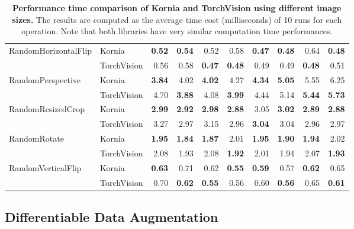 \begin{table}[!ht]
{\begin{tabular}{llrrrrrrrr}
\midrule
RandomHorizontalFlip & Kornia &   \bfseries0.52 &   \bfseries0.54 &   0.52 &   0.58 &   \bfseries0.47 &   \bfseries0.48 &   0.64 &   \bfseries0.48 \\
                   & TorchVision &   0.56 &   0.58 &   \bfseries0.47 &   \bfseries0.48 &   0.49 &   0.49 &   \bfseries0.48 &   0.51 \\
\midrule
RandomPerspective & Kornia &   \bfseries3.84 &   4.02 &   \bfseries4.02 &   4.27 &   \bfseries4.34 &   \bfseries5.05 &   5.55 &   6.25 \\
                   & TorchVision &   4.70 &   \bfseries3.88 &   4.08 &   \bfseries3.99 &   4.44 &   5.14 &   \bfseries5.44 &   \bfseries5.73 \\
\midrule
RandomResizedCrop & Kornia &   \bfseries2.99 &   \bfseries2.92 &   \bfseries2.98 &   \bfseries2.88 &   3.05 &   \bfseries3.02 &   \bfseries2.89 &   \bfseries2.88 \\
                   & TorchVision &   3.27 &   2.97 &   3.15 &   2.96 &   \bfseries3.04 &   3.04 &   2.96 &   2.97 \\
\midrule
RandomRotate & Kornia &   \bfseries1.95 &   \bfseries1.84 &   \bfseries1.87 &   2.01 &   \bfseries1.95 &   \bfseries1.90 &   \bfseries1.94 &   2.02 \\
                   & TorchVision &   2.08 &   1.93 &   2.08 &   \bfseries1.92 &   2.01 &   1.94 &   2.07 &   \bfseries1.93 \\
\midrule
RandomVerticalFlip & Kornia &   \bfseries0.63 &   0.71 &   0.62 &  \bfseries 0.55 &   \bfseries0.59 &   0.57 &   \bfseries0.62 &   0.65 \\
                   & TorchVision &   0.70 &   \bfseries0.62 &   \bfseries0.55 &   0.56 &   0.60 &   \bfseries0.56 &   0.65 &   \bfseries0.61 \\
\bottomrule
\end{tabular}}
\vspace{.5cm}
\caption[Performance time comparison of Kornia and TorchVision using different image sizes]{\label{tab: op_kornia_vs_torchvision} {\bf Performance time comparison of Kornia and TorchVision using different image sizes.} The results are computed as the average time cost (milliseconds) of 10 runs for each operation. Note that  both libraries have very similar computation time performances.
}
\end{table}

\subsection{Differentiable Data Augmentation}
\label{section:use_cases:differentiable computer vision}

